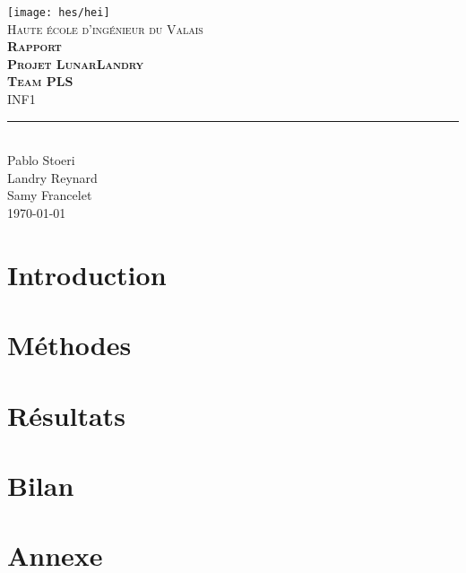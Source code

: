 \documentclass[11pt,titlepage]{report}
\def\Team{Team PLS}
\def\Autora{Pablo Stoeri}
\def\Autorb{Landry Reynard}
\def\Autorc{Samy Francelet}
\begin{document}
\begin{titlepage}
	\centering
    \texttt{[image: hes/hei]}\\[1cm] 	%
    \textsc{\LARGE Haute école d'ingénieur du Valais}\\ \vspace{\fill}
    \textbf{\textsc{\fontsize{50}{50}\selectfont Rapport}}\\[0.8cm]
		\textbf{\textsc{\fontsize{30}{30}\selectfont Projet LunarLandry}}\\[0.8cm]
		\textbf{\textsc{\fontsize{20}{20}\selectfont \Team }}\\ \vspace{\fill}
	\textsc{\LARGE INF1}\\[0.4cm]
	\rule{\linewidth}{0.2 mm} \\[0.5 cm]
		\Autora \\
		\Autorb \\
		\Autorc \\[2cm]
	\today
\end{titlepage}
\restoregeometry

\tableofcontents

\chapter{Introduction}


\chapter{Méthodes}


\chapter{Résultats}


\chapter{Bilan}


\chapter{Annexe}

\end{document}

